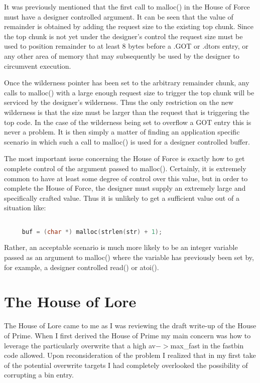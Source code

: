 \documentclass[12pt]{article}
\begin{document}
It was previously mentioned that the first call to malloc() in the
House of Force must have a designer controlled argument. It can be
seen that the value of remainder is obtained by adding the request
size to the existing top chunk. Since the top chunk is not yet
under the designer's control the request size must be used to
position remainder to at least 8 bytes before a .GOT or .dtors
entry, or any other area of memory that may subsequently be used by
the designer to circumvent execution.
\newline


Once the wilderness pointer has been set to the arbitrary remainder
chunk, any calls to malloc() with a large enough request size to
trigger the top chunk will be serviced by the designer's
wilderness. Thus the only restriction on the new wilderness is that
the size must be larger than the request that is triggering the top
code. In the case of the wilderness being set to overflow a GOT
entry this is never a problem. It is then simply a matter of
finding an application specific scenario in which such a call to
malloc() is used for a designer controlled buffer.
\newline


The most important issue concerning the House of Force is exactly
how to get complete control of the argument passed to malloc().
Certainly, it is extremely common to have at least some degree of
control over this value, but in order to complete the House of
Force, the designer must supply an extremely large and specifically
crafted value. Thus it is unlikely to get a sufficient value out of
a situation like:

\begin{lstlisting}[language=C]

     buf = (char *) malloc(strlen(str) + 1);
\end{lstlisting}

Rather, an acceptable scenario is much more likely to be an integer
variable passed as an argument to malloc() where the variable has
previously been set by, for example, a designer controlled read()
or atoi().


\section{The House of Lore}

The House of Lore came to me as I was reviewing the draft write-up
of the House of Prime. When I first derived the House of Prime my
main concern was how to leverage the particularly overwrite that a
high av$->$max\_fast in the fastbin code allowed. Upon reconsideration
of the problem I realized that in my first take of the potential
overwrite targets I had completely overlooked the possibility of
corrupting a bin entry.
\newline
\end{document}
